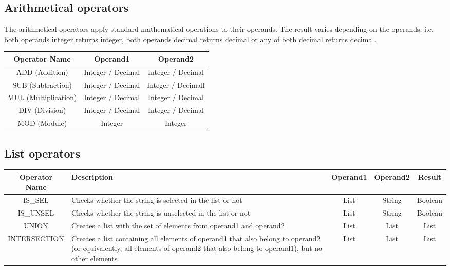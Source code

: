 \documentclass{article}
\begin{document}
\subsection{Arithmetical operators}

The arithmetical operators apply standard mathematical operations to their operands. The result varies depending on the operands, i.e. both operands integer returns integer, both operands decimal returns decimal or any of both decimal returns decimal.

\begin{center}
  \begin{tabular}{| c | c | c | }
    \hline
    \textbf{Operator Name} & \textbf{Operand1} & \textbf{Operand2} \\ \hline
    \multirow{1}{*}{ ADD (Addition)} & Integer / Decimal & Integer / Decimal\\
    \hline
    \multirow{1}{*}{ SUB (Subtraction)} & Integer / Decimal & Integer / Decimall\\
    \hline
    \multirow{1}{*}{ MUL (Multiplication)} & Integer / Decimal & Integer / Decimal\\
    \hline
    \multirow{1}{*}{ DIV (Division)} & Integer / Decimal & Integer / Decimal \\
    \hline
    \multirow{1}{*}{ MOD (Module)} & Integer & Integer \\
    \hline
 \end{tabular}
\end{center}
\subsection{List operators}
\begin{center}
  \begin{tabular}{| c | p{3cm} | c | c | c|}
    \hline
    \textbf{Operator Name} & \textbf{Description} & \textbf{Operand1} & \textbf{Operand2} & \textbf{Result} \\ \hline
    \multirow{1}{*}{IS\_SEL} & Checks whether the string is selected in the list or not & List & String & Boolean \\ \hline
    \multirow{1}{*}{IS\_UNSEL} & Checks whether the string is unselected in the list or not & List & String & Boolean \\ \hline
    \multirow{1}{*}{UNION} & Creates a list with the set of elements from operand1 and operand2 & List & List & List \\ \hline
    \multirow{1}{*}{INTERSECTION} & Creates a list containing all elements of operand1 that also belong to operand2 (or equivalently, all elements of operand2 that also belong to operand1), but no other elements & List & List & List \\ \hline
  \end{tabular}
\end{center}
\newpage
\end{document}
